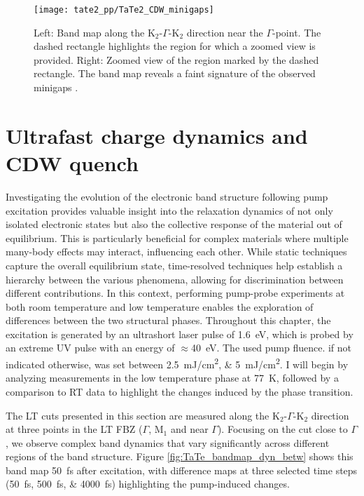 \begin{figure}[t]
	\centering
	\texttt{[image: tate2\_pp/TaTe2\_CDW\_minigaps]}
	\caption{Left: Band map along the K$_2$-$\Gamma$-K$_2$ direction near the $\Gamma$-point. The dashed rectangle highlights the region for which a zoomed view is provided. Right: Zoomed view of the region marked by the dashed rectangle. The band map reveals a faint signature of the observed minigaps \cite{lin_evidence_2022}.}
	\label{fig:TaTe_minigaps}
\end{figure}

\section{Ultrafast charge dynamics and CDW quench}
\label{sec:tate_dynamics}

Investigating the evolution of the electronic band structure following pump excitation provides valuable insight into the relaxation dynamics of not only isolated electronic states but also the collective response of the material out of equilibrium.
This is particularly beneficial for complex materials where multiple many-body effects may interact, influencing each other.
While static techniques capture the overall equilibrium state, time-resolved techniques help establish a hierarchy between the various phenomena, allowing for discrimination between different contributions.
In this context, performing pump-probe experiments at both room temperature and low temperature enables the exploration of differences between the two structural phases.
Throughout this chapter, the excitation is generated by an ultrashort laser pulse of \qty{1.6}{\electronvolt}, which is probed by an extreme UV pulse with an energy of $\approx$\qty{40}{\electronvolt}.
The used pump fluence. if not indicated otherwise, was set between \qtylist{2.5;5}{\milli\joule/\centi\meter\squared}.
I will begin by analyzing measurements in the low temperature phase at \qty{77}{\kelvin}, followed by a comparison to RT data to highlight the changes induced by the phase transition.

The LT cuts presented in this section are measured along the K$_2$-$\Gamma$-K$_2$ direction at three points in the LT FBZ ($\Gamma$, M$_1$ and near $\Gamma$).
Focusing on the cut close to $\Gamma$, we observe complex band dynamics that vary significantly across different regions of the band structure.
Figure \ref{fig:TaTe_bandmap_dyn_betw} shows this band map \qty{50}{\femto\second} after excitation, with difference maps at three selected time steps (\qtylist{50; 500; 4000}{\femto\second}) highlighting the pump-induced changes.

